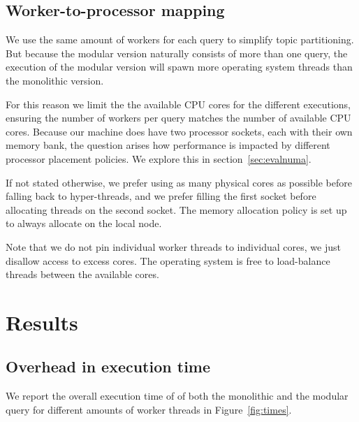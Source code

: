 \subsection{Worker-to-processor mapping}

We use the same amount of workers for each query to simplify topic partitioning.
But because the modular version naturally consists of more than one query,
the execution of the modular version will spawn more operating system threads
than the monolithic version.

For this reason we limit the the available CPU cores for the different executions,
ensuring the number of workers per query matches the number of available CPU cores.
Because our machine does have two processor sockets, each with their own memory bank,
the question arises how performance is impacted by different processor placement
policies. We explore this in section~\ref{sec:evalnuma}.

If not stated otherwise, we prefer using as many physical cores 
as possible before falling back to hyper-threads, and we prefer filling the
first socket before allocating threads on the second socket. The memory
allocation policy is set up to always allocate on the local node.

Note that we do not pin individual worker threads to individual cores, we just
disallow access to excess cores. The operating system is free to load-balance
threads between the available cores.

\clearpage

\section{Results}

\subsection{Overhead in execution time}

We report the overall execution time of of both the monolithic and the 
modular query for different amounts of worker threads in Figure~\ref{fig:times}.

